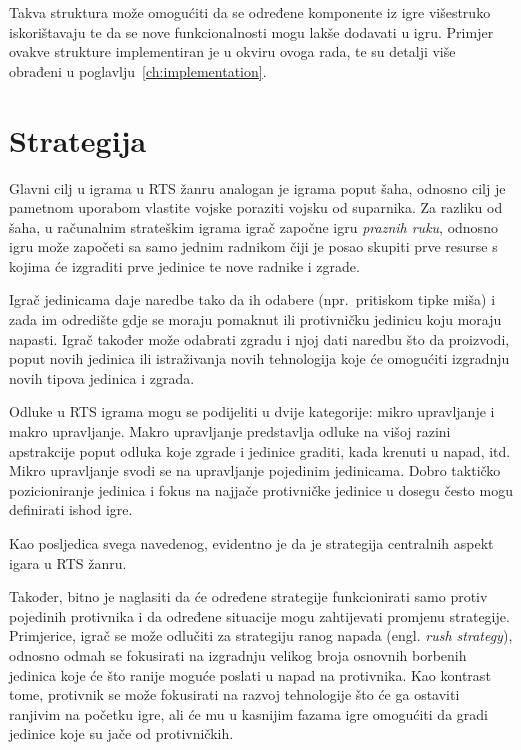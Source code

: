 \documentclass[times, utf8, zavrsni, numeric]{fer}
\begin{document}
\par Takva struktura može omogućiti da se određene komponente iz igre višestruko iskorištavaju te da se nove funkcionalnosti mogu lakše dodavati u igru.
Primjer ovakve strukture implementiran je u okviru ovoga rada, te su detalji više obrađeni u poglavlju~\ref{ch:implementation}.

\section{Strategija}

\par Glavni cilj u igrama u RTS žanru analogan je igrama poput šaha, odnosno cilj je pametnom uporabom vlastite vojske poraziti vojsku od suparnika. 
Za razliku od šaha, u računalnim strateškim igrama igrač započne igru \textit{praznih ruku}, odnosno igru može započeti sa samo jednim radnikom čiji je posao skupiti prve resurse s kojima će izgraditi prve jedinice te nove radnike i zgrade.

\par Igrač jedinicama daje naredbe tako da ih odabere (npr.\ pritiskom tipke miša) i zada im odredište gdje se moraju pomaknut ili protivničku jedinicu koju moraju napasti. 
Igrač također može odabrati zgradu i njoj dati naredbu što da proizvodi, poput novih jedinica ili istraživanja novih tehnologija koje će omogućiti izgradnju novih tipova jedinica i zgrada.

\par Odluke u RTS igrama mogu se podijeliti u dvije kategorije: mikro upravljanje i makro upravljanje. 
Makro upravljanje predstavlja odluke na višoj razini apstrakcije poput odluka koje zgrade i jedinice graditi, kada krenuti u napad, itd. 
Mikro upravljanje svodi se na upravljanje pojedinim jedinicama.
Dobro taktičko pozicioniranje jedinica i fokus na najjače protivničke jedinice u dosegu često mogu definirati ishod igre.\cite{article:HybridPathdinding}

\par Kao posljedica svega navedenog, evidentno je da je strategija centralnih aspekt igara u RTS žanru. 

\par Također, bitno je naglasiti da će određene strategije funkcionirati samo protiv pojedinih protivnika i da određene situacije mogu zahtijevati promjenu strategije. 
Primjerice, igrač se može odlučiti za strategiju ranog napada (engl. \textit{rush strategy}), odnosno odmah se fokusirati na izgradnju velikog broja osnovnih borbenih jedinica koje će što ranije moguće poslati u napad na protivnika.
Kao kontrast tome, protivnik se može fokusirati na razvoj tehnologije što će ga ostaviti ranjivim na početku igre, ali će mu u kasnijim fazama igre omogućiti da gradi jedinice koje su jače od protivničkih.
\end{document}
